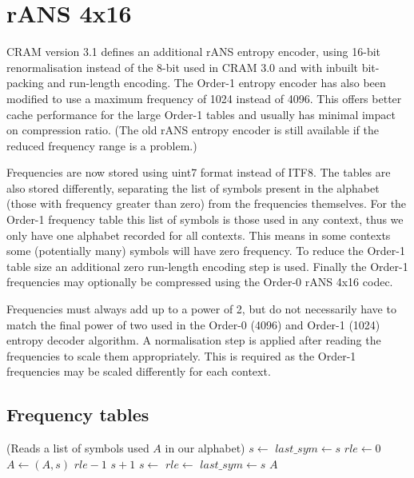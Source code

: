 \documentclass[a4paper]{article}
\begin{document}
\section{rANS 4x16}


CRAM version 3.1 defines an additional rANS entropy encoder, using
16-bit renormalisation instead of the 8-bit used in CRAM 3.0 and with
inbuilt bit-packing and run-length encoding.  The Order-1 entropy
encoder has also been modified to use a maximum frequency of 1024
instead of 4096.  This offers better cache performance for the large
Order-1 tables and usually has minimal impact on compression ratio.
(The old rANS entropy encoder is still available if the reduced
frequency range is a problem.)

Frequencies are now stored using uint7 format instead of ITF8.  The
tables are also stored differently, separating the list of symbols
present in the alphabet (those with frequency greater than zero) from
the frequencies themselves.  For the Order-1 frequency table this list
of symbols is those used in any context, thus we only have one
alphabet recorded for all contexts.  This means in some contexts
some (potentially many) symbols will have zero frequency.  To reduce
the Order-1 table size an additional zero run-length encoding step is
used.  Finally the Order-1 frequencies may optionally be compressed
using the Order-0 rANS 4x16 codec.

Frequencies must always add up to a power of 2, but do not necessarily
have to match the final power of two used in the Order-0 (4096) and
Order-1 (1024) entropy decoder algorithm.  A normalisation step is
applied after reading the frequencies to scale them appropriately.
This is required as the Order-1 frequencies may be scaled differently
for each context.

\subsection{Frequency tables}

\begin{algorithmic}[1]
\Statex (Reads a list of symbols used $A$ in our alphabet)
\State $s \gets$ 
\State $last\_sym \gets s$
\State $rle \gets 0$
\Repeat
  \State $A \gets (A,s)$ 
    \settowidth{\maxwidth}{rle\ }
    \State {} $rle-1$
    \State {} $s+1$
  \Else
    \State $s \gets$ 
      \State $rle \gets$ 
    \EndIf
  \EndIf
  \State $last\_sym \gets s$
\State \Return $A$
\EndFunction
\end{algorithmic}
\end{document}
